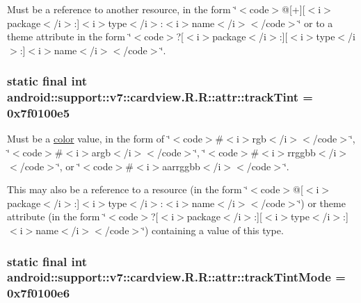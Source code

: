 Must be a reference to another resource, in the form \char`\"{}$<$code$>$@\mbox{[}+\mbox{]}\mbox{[}$<$i$>$package$<$/i$>$:\mbox{]}$<$i$>$type$<$/i$>$:$<$i$>$name$<$/i$>$$<$/code$>$\char`\"{} or to a theme attribute in the form \char`\"{}$<$code$>$?\mbox{[}$<$i$>$package$<$/i$>$:\mbox{]}\mbox{[}$<$i$>$type$<$/i$>$:\mbox{]}$<$i$>$name$<$/i$>$$<$/code$>$\char`\"{}. \hypertarget{classandroid_1_1support_1_1v7_1_1cardview_1_1_r_1_1attr_e6dbaa18c1b2c661f9db18649f62d5ea}{
\subsubsection[{trackTint}]{\setlength{\rightskip}{0pt plus 5cm}static final int android::support::v7::cardview.R.R::attr::trackTint = 0x7f0100e5}}
\label{classandroid_1_1support_1_1v7_1_1cardview_1_1_r_1_1attr_e6dbaa18c1b2c661f9db18649f62d5ea}


Must be a \hyperlink{classandroid_1_1support_1_1v7_1_1cardview_1_1_r_1_1color}{color} value, in the form of \char`\"{}$<$code$>$\#$<$i$>$rgb$<$/i$>$$<$/code$>$\char`\"{}, \char`\"{}$<$code$>$\#$<$i$>$argb$<$/i$>$$<$/code$>$\char`\"{}, \char`\"{}$<$code$>$\#$<$i$>$rrggbb$<$/i$>$$<$/code$>$\char`\"{}, or \char`\"{}$<$code$>$\#$<$i$>$aarrggbb$<$/i$>$$<$/code$>$\char`\"{}. 

This may also be a reference to a resource (in the form \char`\"{}$<$code$>$@\mbox{[}$<$i$>$package$<$/i$>$:\mbox{]}$<$i$>$type$<$/i$>$:$<$i$>$name$<$/i$>$$<$/code$>$\char`\"{}) or theme attribute (in the form \char`\"{}$<$code$>$?\mbox{[}$<$i$>$package$<$/i$>$:\mbox{]}\mbox{[}$<$i$>$type$<$/i$>$:\mbox{]}$<$i$>$name$<$/i$>$$<$/code$>$\char`\"{}) containing a value of this type. \hypertarget{classandroid_1_1support_1_1v7_1_1cardview_1_1_r_1_1attr_e06615fa90c0f4b2a66e00cf03e19c06}{
\subsubsection[{trackTintMode}]{\setlength{\rightskip}{0pt plus 5cm}static final int android::support::v7::cardview.R.R::attr::trackTintMode = 0x7f0100e6}}
\label{classandroid_1_1support_1_1v7_1_1cardview_1_1_r_1_1attr_e06615fa90c0f4b2a66e00cf03e19c06}


